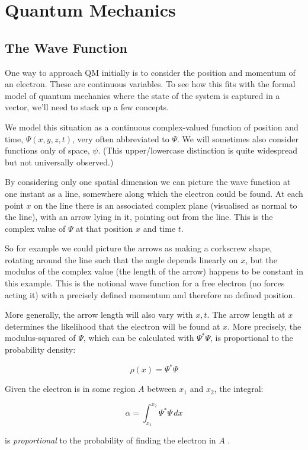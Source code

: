 \chapter{Quantum Mechanics}
\section{The Wave Function}

One way to approach QM initially is to consider the position and momentum of an electron. These are continuous variables. To see how this fits with the formal model of quantum mechanics where the state of the system is captured in a vector, we'll need to stack up a few concepts.

We model this situation as a continuous complex-valued function of position and time, $\Psi(x, y, z, t)$, very often abbreviated to $\Psi$. We will sometimes also consider functions only of space, $\psi$. (This upper/lowercase distinction is quite widespread but not universally observed.)

By considering only one spatial dimension we can picture the wave function at one instant as a line, somewhere along which the electron could be found. At each point $x$ on the line there is an associated complex plane (visualised as normal to the line), with an arrow lying in it, pointing out from the line. This is the complex value of $\Psi$ at that position $x$ and time $t$.

So for example we could picture the arrows as making a corkscrew shape, rotating around the line such that the angle depends linearly on $x$, but the modulus of the complex value (the length of the arrow) happens to be constant in this example. This is the notional wave function for a free electron (no forces acting it) with a precisely defined momentum and therefore no defined position.

More generally, the arrow length will also vary with $x, t$. The arrow length at $x$ determines the likelihood that the electron will be found at $x$. More precisely, the modulus-squared of $\Psi$, which can be calculated with $\Psi^*\Psi$, is proportional to the probability density:

$$\rho(x) = \Psi^*\Psi$$

Given the electron is in some region $A$ between $x_1$ and $x_2$, the integral:

$$
\alpha =
\int_{x_1}^{x_2}
\Psi^*\Psi
\,dx
$$

is \textit{proportional} to the probability of finding the electron in $A$ .

